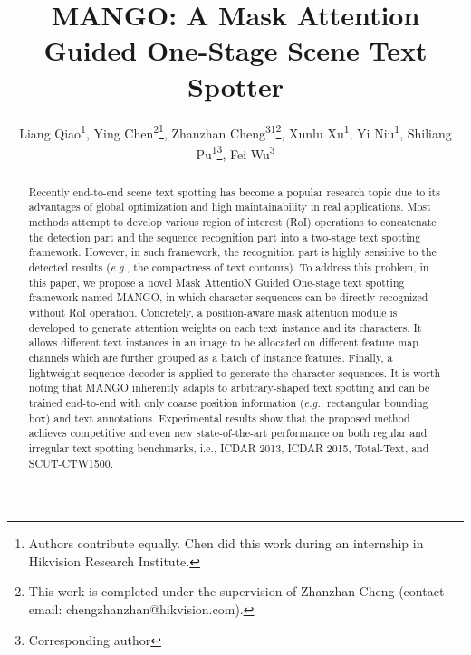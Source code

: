 \documentclass[letterpaper]{article} \usepackage{aaai21}  \usepackage{times}  \usepackage{helvet} \usepackage{courier}  \usepackage[hyphens]{url}  \usepackage{graphicx} \urlstyle{rm} \def\UrlFont{\rm}  \usepackage{natbib}  \usepackage{caption} \frenchspacing  \setlength{\pdfpagewidth}{8.5in}  \setlength{\pdfpageheight}{11in}  \usepackage{multirow}
\title{MANGO: A Mask Attention Guided One-Stage Scene Text Spotter}
\author{Liang Qiao\textsuperscript{\rm 1}\footnotemark[1],
        Ying Chen\textsuperscript{\rm 2}\thanks{Authors contribute equally. Chen did this work during an internship in Hikvision Research Institute.},
        Zhanzhan Cheng\textsuperscript{\rm 31}\thanks{This work is completed under the supervision of Zhanzhan Cheng (contact email:
chengzhanzhan@hikvision.com).},
        Xunlu Xu\textsuperscript{\rm 1},
        Yi Niu\textsuperscript{\rm 1},
        Shiliang Pu\textsuperscript{\rm 1}\thanks{Corresponding author},
        Fei Wu\textsuperscript{\rm 3}\\
}
\begin{document}
\maketitle
\begin{abstract}
Recently end-to-end scene text spotting has become a popular research topic due to its advantages of global optimization and high maintainability in real applications.
Most methods attempt to develop various region of interest (RoI) operations to concatenate the detection part and the sequence recognition part into a two-stage text spotting framework.
However, in such framework, the recognition part is highly sensitive to the detected results (\emph{e.g.}, the compactness of text contours).
To address this problem, in this paper, we propose a novel Mask AttentioN Guided One-stage text spotting framework named MANGO, in which character sequences can be directly recognized without RoI operation.
Concretely, a position-aware mask attention module is developed to generate attention weights on each text instance and its characters.
It allows different text instances in an image to be allocated on different feature map channels which are further grouped as a batch of instance features.
Finally, a lightweight sequence decoder is applied to generate the character sequences.
It is worth noting that MANGO inherently adapts to arbitrary-shaped text spotting and can be trained end-to-end with only coarse position information (\emph{e.g.}, rectangular bounding box) and text annotations.
Experimental results show that the proposed method achieves competitive and even new state-of-the-art performance on both regular and irregular text spotting benchmarks, i.e., ICDAR 2013, ICDAR 2015, Total-Text, and SCUT-CTW1500.
\end{abstract}
\end{document}
